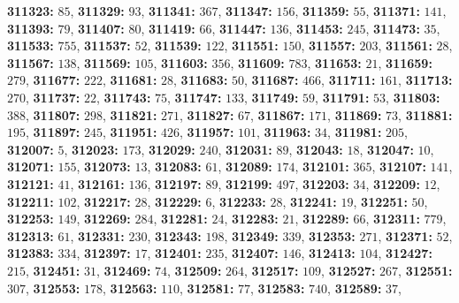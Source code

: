 \textsf{\bfseries 311323:} $85$, \textsf{\bfseries 311329:} $93$, \textsf{\bfseries 311341:} $367$, \textsf{\bfseries 311347:} $156$, \textsf{\bfseries 311359:} $55$, \textsf{\bfseries 311371:} $141$, \textsf{\bfseries 311393:} $79$, \textsf{\bfseries 311407:} $80$, \textsf{\bfseries 311419:} $66$, \textsf{\bfseries 311447:} $136$, \textsf{\bfseries 311453:} $245$, \textsf{\bfseries 311473:} $35$, \textsf{\bfseries 311533:} $755$, \textsf{\bfseries 311537:} $52$, \textsf{\bfseries 311539:} $122$, \textsf{\bfseries 311551:} $150$, \textsf{\bfseries 311557:} $203$, \textsf{\bfseries 311561:} $28$, \textsf{\bfseries 311567:} $138$, \textsf{\bfseries 311569:} $105$, \textsf{\bfseries 311603:} $356$, \textsf{\bfseries 311609:} $783$, \textsf{\bfseries 311653:} $21$, \textsf{\bfseries 311659:} $279$, \textsf{\bfseries 311677:} $222$, \textsf{\bfseries 311681:} $28$, \textsf{\bfseries 311683:} $50$, \textsf{\bfseries 311687:} $466$, \textsf{\bfseries 311711:} $161$, \textsf{\bfseries 311713:} $270$, \textsf{\bfseries 311737:} $22$, \textsf{\bfseries 311743:} $75$, \textsf{\bfseries 311747:} $133$, \textsf{\bfseries 311749:} $59$, \textsf{\bfseries 311791:} $53$, \textsf{\bfseries 311803:} $388$, \textsf{\bfseries 311807:} $298$, \textsf{\bfseries 311821:} $271$, \textsf{\bfseries 311827:} $67$, \textsf{\bfseries 311867:} $171$, \textsf{\bfseries 311869:} $73$, \textsf{\bfseries 311881:} $195$, \textsf{\bfseries 311897:} $245$, \textsf{\bfseries 311951:} $426$, \textsf{\bfseries 311957:} $101$, \textsf{\bfseries 311963:} $34$, \textsf{\bfseries 311981:} $205$, \textsf{\bfseries 312007:} $5$, \textsf{\bfseries 312023:} $173$, \textsf{\bfseries 312029:} $240$, \textsf{\bfseries 312031:} $89$, \textsf{\bfseries 312043:} $18$, \textsf{\bfseries 312047:} $10$, \textsf{\bfseries 312071:} $155$, \textsf{\bfseries 312073:} $13$, \textsf{\bfseries 312083:} $61$, \textsf{\bfseries 312089:} $174$, \textsf{\bfseries 312101:} $365$, \textsf{\bfseries 312107:} $141$, \textsf{\bfseries 312121:} $41$, \textsf{\bfseries 312161:} $136$, \textsf{\bfseries 312197:} $89$, \textsf{\bfseries 312199:} $497$, \textsf{\bfseries 312203:} $34$, \textsf{\bfseries 312209:} $12$, \textsf{\bfseries 312211:} $102$, \textsf{\bfseries 312217:} $28$, \textsf{\bfseries 312229:} $6$, \textsf{\bfseries 312233:} $28$, \textsf{\bfseries 312241:} $19$, \textsf{\bfseries 312251:} $50$, \textsf{\bfseries 312253:} $149$, \textsf{\bfseries 312269:} $284$, \textsf{\bfseries 312281:} $24$, \textsf{\bfseries 312283:} $21$, \textsf{\bfseries 312289:} $66$, \textsf{\bfseries 312311:} $779$, \textsf{\bfseries 312313:} $61$, \textsf{\bfseries 312331:} $230$, \textsf{\bfseries 312343:} $198$, \textsf{\bfseries 312349:} $339$, \textsf{\bfseries 312353:} $271$, \textsf{\bfseries 312371:} $52$, \textsf{\bfseries 312383:} $334$, \textsf{\bfseries 312397:} $17$, \textsf{\bfseries 312401:} $235$, \textsf{\bfseries 312407:} $146$, \textsf{\bfseries 312413:} $104$, \textsf{\bfseries 312427:} $215$, \textsf{\bfseries 312451:} $31$, \textsf{\bfseries 312469:} $74$, \textsf{\bfseries 312509:} $264$, \textsf{\bfseries 312517:} $109$, \textsf{\bfseries 312527:} $267$, \textsf{\bfseries 312551:} $307$, \textsf{\bfseries 312553:} $178$, \textsf{\bfseries 312563:} $110$, \textsf{\bfseries 312581:} $77$, \textsf{\bfseries 312583:} $740$, \textsf{\bfseries 312589:} $37$, 
